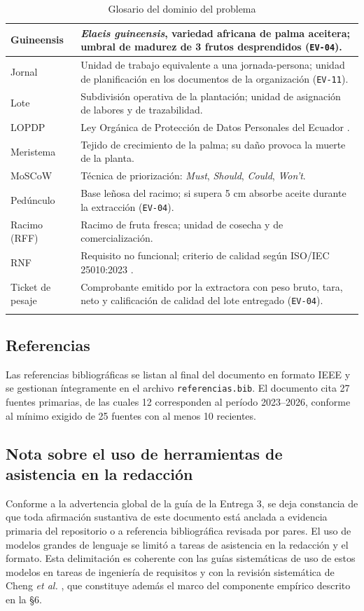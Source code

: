 \documentclass[11pt,a4paper]{article}
\newcommand{\id}[1]{\texttt{\begingroup\hyphenpenalty=10000\relax#1\endgroup}}
\renewcommand{\id}[1]{\texttt{#1}}
\begin{document}
\begin{longtable}{|L{3.6cm}|L{11.8cm}|}
Guineensis & \emph{Elaeis guineensis}, variedad africana de palma aceitera; umbral de madurez de 3 frutos desprendidos (\id{EV-04}). \\ \hline
Jornal & Unidad de trabajo equivalente a una jornada-persona; unidad de planificación en los documentos de la organización (\id{EV-11}). \\ \hline
Lote & Subdivisión operativa de la plantación; unidad de asignación de labores y de trazabilidad. \\ \hline
LOPDP & Ley Orgánica de Protección de Datos Personales del Ecuador \cite{lopdp}. \\ \hline
Meristema & Tejido de crecimiento de la palma; su daño provoca la muerte de la planta. \\ \hline
MoSCoW & Técnica de priorización: \emph{Must}, \emph{Should}, \emph{Could}, \emph{Won't}. \\ \hline
Pedúnculo & Base leñosa del racimo; si supera 5 cm absorbe aceite durante la extracción (\id{EV-04}). \\ \hline
Racimo (RFF) & Racimo de fruta fresca; unidad de cosecha y de comercialización. \\ \hline
RNF & Requisito no funcional; criterio de calidad según ISO/IEC 25010:2023 \cite{iso25010}. \\ \hline
Ticket de pesaje & Comprobante emitido por la extractora con peso bruto, tara, neto y calificación de calidad del lote entregado (\id{EV-04}). \\ \hline
\caption{Glosario del dominio del problema}
\end{longtable}

\subsection{Referencias}

Las referencias bibliográficas se listan al final del documento en formato IEEE y se gestionan
íntegramente en el archivo \id{referencias.bib}. El documento cita 27 fuentes primarias, de las
cuales 12 corresponden al período 2023--2026, conforme al mínimo exigido de 25 fuentes con al
menos 10 recientes.

\subsection{Nota sobre el uso de herramientas de asistencia en la redacción}

Conforme a la advertencia global de la guía de la Entrega 3, se deja constancia de que toda
afirmación sustantiva de este documento está anclada a evidencia primaria del repositorio o a
referencia bibliográfica revisada por pares. El uso de modelos grandes de lenguaje se limitó a
tareas de asistencia en la redacción y el formato. Esta delimitación es coherente con las guías
sistemáticas de uso de estos modelos en tareas de ingeniería de requisitos
\cite{vogelsang2024,arora2024} y con la revisión sistemática de Cheng \emph{et al.}
\cite{cheng2026}, que constituye además el marco del componente empírico descrito en la §6.
\end{document}
